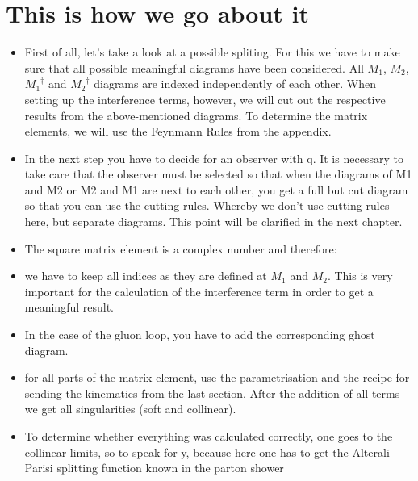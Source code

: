 \section*{This is how we go about it}
\begin{itemize}
\item First of all, let's take a look at a possible spliting. For this we have to make sure that all possible meaningful diagrams have been considered.
All $ M_1 $, $ M_2 $, $ {M_1}^{\dagger} $ and $ {M_2}^{\dagger}$ diagrams are indexed independently of each other. When setting up the interference terms, however, we will cut out the respective results from the above-mentioned diagrams. To determine the matrix elements, we will use the Feynmann Rules from the appendix.
\item In the next step you have to decide for an observer with q. It is necessary to take care that the observer must be selected so that when the diagrams of M1 and M2 or M2 and M1 are next to each other, you get a full but cut diagram so that you can use the cutting rules. Whereby we don't use cutting rules here, but separate diagrams. This point will be clarified in the next chapter.
\item The square matrix element is a complex number and therefore:
\item we have to keep all indices as they are defined at $M_1$ and $M_2$. This is very important for the calculation of the interference term in order to get a meaningful result.
\item In the case of the gluon loop, you have to add the corresponding ghost diagram.
\item for all parts of the matrix element, use the parametrisation and the recipe for sending the kinematics from the last section.
After the addition of all terms we get all singularities (soft and collinear). 
\item To determine whether everything was calculated correctly, one goes to the collinear limits, so to speak for y, because here one has to get the Alterali-Parisi splitting function known in the parton shower
\end{itemize}